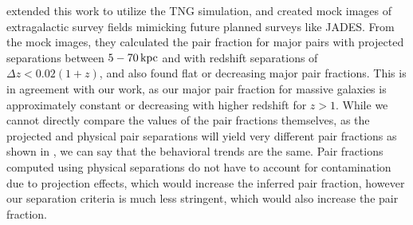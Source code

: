 \documentclass[twocolumn]{aastex631}
\begin{document}
\citet{snyder2023} extended this work to utilize the TNG simulation, and created mock images of extragalactic survey fields mimicking future planned surveys like JADES.
From the mock images, they calculated the pair fraction for major pairs with projected separations between $5-70 \mathrm{\,kpc}$ and with redshift separations of $\Delta z< 0.02(1+z)$, and also found flat or decreasing major pair fractions. 
This is in agreement with our work, as our major pair fraction for massive galaxies is approximately constant or decreasing with higher redshift for $z>1$. 
While we cannot directly compare the values of the pair fractions themselves, as the projected and physical pair separations will yield very different pair fractions as shown in \citet{Besla2018}, we can say that the behavioral trends are the same. 
Pair fractions computed using physical separations do not have to account for contamination due to projection effects, which would increase the inferred pair fraction, however our separation criteria is much less stringent, which would also increase the pair fraction. 


\end{document}
